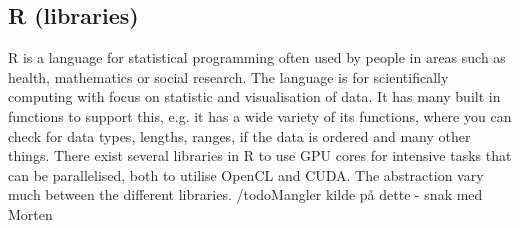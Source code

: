 \subsection{R (libraries)} %
R is a language for statistical programming often used by people in areas such as health, mathematics or social research.
The language is for scientifically computing with focus on statistic and visualisation of data.
It has many built in functions to support this, e.g. it has a wide variety of its functions, where you can check for data types, lengths, ranges, if the data is ordered and many other things.
There exist several libraries in R to use GPU cores for intensive tasks that can be parallelised, both to utilise OpenCL and CUDA. 
The abstraction vary much between the different libraries. /todo{Mangler kilde på dette - snak med Morten}
\citep{R_history,R_speed}

                             
